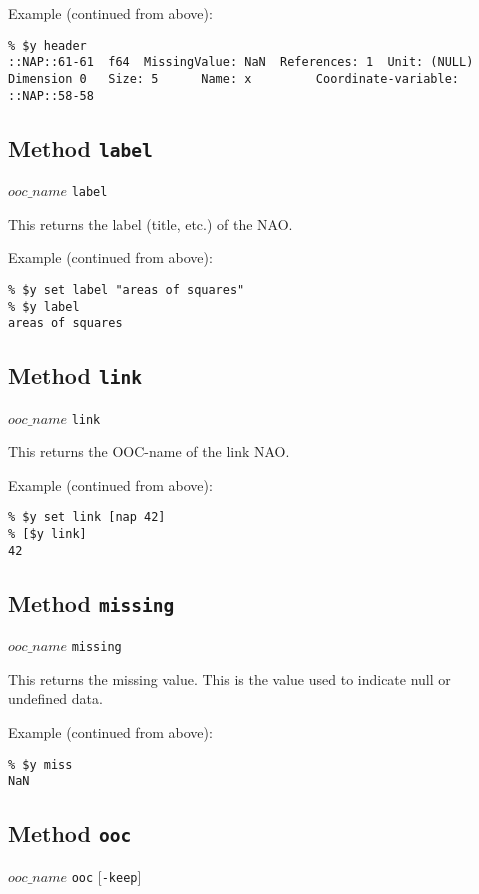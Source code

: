 Example (continued from above):
  \begin{verbatim}
% $y header
::NAP::61-61  f64  MissingValue: NaN  References: 1  Unit: (NULL)
Dimension 0   Size: 5      Name: x         Coordinate-variable: ::NAP::58-58
\end{verbatim}

\subsection{Method \texttt{label}}
    \label{ooc-meta-label}

$ooc\_name$ \texttt{label}

This returns the label (title, etc.) of the NAO.
  
Example (continued from above):
  \begin{verbatim}
% $y set label "areas of squares"
% $y label
areas of squares
\end{verbatim}

\subsection{Method \texttt{link}}
    \label{ooc-meta-link}

  $ooc\_name$ 
  \texttt{link}

This returns the OOC-name of the link NAO.
  
Example (continued from above):
  \begin{verbatim}
% $y set link [nap 42]
% [$y link]
42
\end{verbatim}

\subsection{Method \texttt{missing}}
    \label{ooc-meta-missing}

  $ooc\_name$ 
  \texttt{missing}

This returns the missing value. This is the value used to indicate
  null or undefined data.
  
Example (continued from above):
  \begin{verbatim}
% $y miss
NaN
\end{verbatim}

\subsection{Method \texttt{ooc}}
    \label{ooc-meta-ooc}

$ooc\_name$ \texttt{ooc} [\texttt{-keep}]

